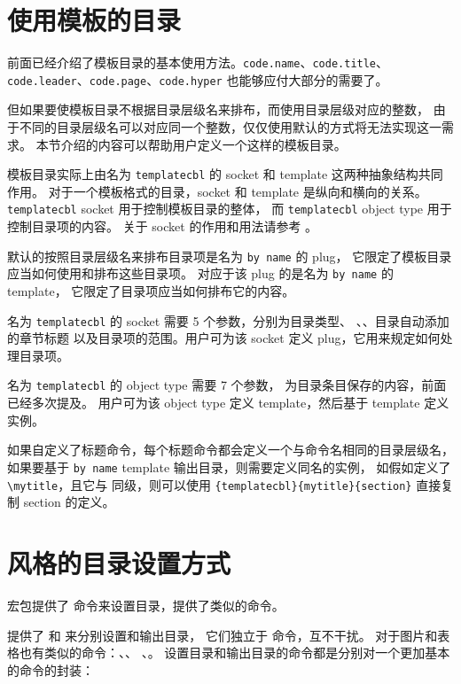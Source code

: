 \documentclass{whudoc}
\begin{document}
\section{使用模板的目录}\label{sec:template-cbl}

前面已经介绍了模板目录的基本使用方法。\texttt{code.name}、\texttt{code.title}、
\texttt{code.leader}、\texttt{code.page}、\texttt{code.hyper} 也能够应付大部分的需要了。

但如果要使模板目录不根据目录层级名来排布，而使用目录层级对应的整数，
由于不同的目录层级名可以对应同一个整数，仅仅使用默认的方式将无法实现这一需求。
本节介绍的内容可以帮助用户定义一个这样的模板目录。

模板目录实际上由名为 \texttt{templatecbl} 的 socket 和 template 这两种抽象结构共同作用。
对于一个模板格式的目录，socket 和 template 是纵向和横向的关系。
\texttt{templatecbl} socket 用于控制模板目录的整体，
而 \texttt{templatecbl} object type 用于控制目录项的内容。
关于 socket 的作用和用法请参考 。

默认的按照目录层级名来排布目录项是名为 \verb|by name| 的 plug，
它限定了模板目录应当如何使用和排布这些目录项。
对应于该 plug 的是名为 \verb|by name| 的 template，
它限定了目录项应当如何排布它的内容。

名为 \texttt{templatecbl} 的 socket 需要 5 个参数，分别为目录类型、
、、目录自动添加的章节标题
以及目录项的范围。用户可为该 socket 定义 plug，它用来规定如何处理目录项。

名为 \texttt{templatecbl} 的 object type 需要 7 个参数，
为目录条目保存的内容，前面已经多次提及。
用户可为该 object type 定义 template，然后基于 template 定义实例。

如果自定义了标题命令，每个标题命令都会定义一个与命令名相同的目录层级名，
如果要基于 \texttt{by name} template 输出目录，则需要定义同名的实例，
如假如定义了 \verb|\mytitle|，且它与  同级，则可以使用
 \verb|{templatecbl}{mytitle}{section}| 
直接复制 section 的定义。


\section{风格的目录设置方式}

 宏包提供了  命令来设置目录，\WhuTeX 提供了类似的命令。

\WhuTeX 提供了  和  来分别设置和输出目录，
它们独立于  命令，互不干扰。
对于图片和表格也有类似的命令：、、
、。
设置目录和输出目录的命令都是分别对一个更加基本的命令的封装：
\begin{xample}
\newcommand{\tocsetstyle}{\SetSpecifiedCombinedListStyle[toc]}
\newcommand{\specifiedtoc}{\SpecifiedCombinedList[toc]}
\newcommand{\lofsetstyle}{\SetSpecifiedCombinedListStyle[lof]{figure}}
\newcommand{\specifiedlof}{\SpecifiedCombinedList[lof]}
\newcommand{\lotsetstyle}{\SetSpecifiedCombinedListStyle[lot]{table}}
\newcommand{\specifiedlot}{\SpecifiedCombinedList[lot]}
\stopxamplecode
\xamplecode \medskip
\end{xample}
\end{document}
